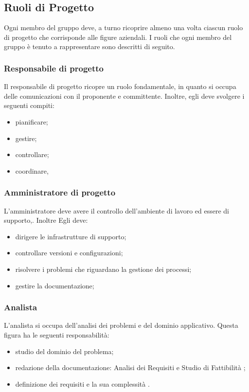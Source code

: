 \subsection{Ruoli di Progetto}
Ogni membro del gruppo deve, a turno ricoprire almeno una volta ciascun ruolo di progetto che corrisponde alle figure aziendali. I ruoli che ogni membro del gruppo è tenuto a rappresentare sono descritti di seguito.



\subsubsection{Responsabile di progetto}
Il responsabile di progetto ricopre un ruolo fondamentale, in quanto si occupa delle comunicazioni con il proponente e committente. Inoltre, egli deve svolgere i seguenti compiti:
\begin{itemize}
\item pianificare;
\item gestire;
\item controllare;
\item coordinare,
\end{itemize}

\subsubsection{Amministratore di progetto}
L'amministratore deve avere il controllo dell'ambiente di lavoro ed essere di supporto,. Inoltre Egli deve: 
\begin{itemize}
\item dirigere le infrastrutture di supporto;
\item controllare versioni e configurazioni;
\item risolvere i problemi che riguardano la gestione dei processi;
\item gestire la documentazione;
\end{itemize}


\subsubsection{Analista}
L'analista si occupa dell'analisi dei problemi e del dominio applicativo. Questa figura ha le seguenti responsabilità:
\begin{itemize}
\item studio del dominio del problema; 
\item redazione della documentazione: Analisi dei Requisiti e Studio di Fattibilità ;
\item definizione dei requisiti e la sua complessità .
\end{itemize}
